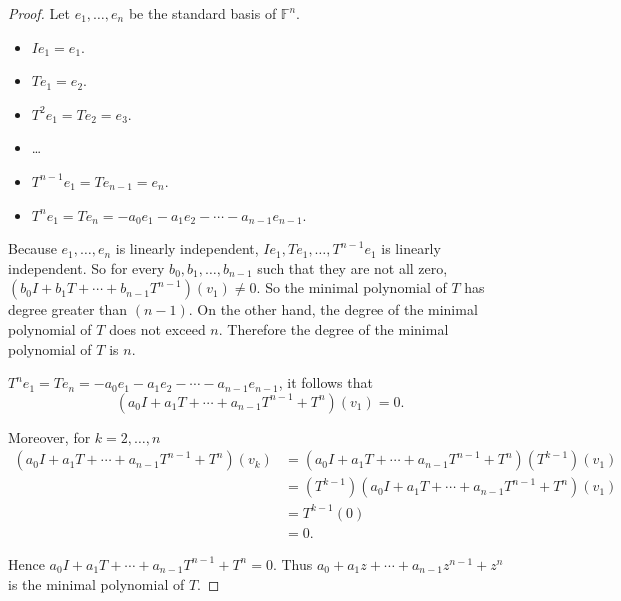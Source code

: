 \begin{proof}
    Let $e_{1}, \ldots, e_{n}$ be the standard basis of $\mathbb{F}^{n}$.
    \begin{itemize}
        \item $Ie_{1} = e_{1}$.
        \item $Te_{1} = e_{2}$.
        \item $T^{2}e_{1} = Te_{2} = e_{3}$.
        \item \ldots
        \item $T^{n-1}e_{1} = Te_{n-1} = e_{n}$.
        \item $T^{n}e_{1} = Te_{n} = -a_{0}e_{1} - a_{1}e_{2} - \cdots - a_{n-1}e_{n-1}$.
    \end{itemize}

    Because $e_{1}, \ldots, e_{n}$ is linearly independent, $Ie_{1}, Te_{1}, \ldots, T^{n-1}e_{1}$ is linearly independent. So for every $b_{0}, b_{1}, \ldots, b_{n-1}$ such that they are not all zero, $(b_{0}I + b_{1}T + \cdots + b_{n-1}T^{n-1})(v_{1})\ne 0$. So the minimal polynomial of $T$ has degree greater than $(n - 1)$. On the other hand, the degree of the minimal polynomial of $T$ does not exceed $n$. Therefore the degree of the minimal polynomial of $T$ is $n$.

    $T^{n}e_{1} = Te_{n} = -a_{0}e_{1} - a_{1}e_{2} - \cdots - a_{n-1}e_{n-1}$, it follows that
    \[
        (a_{0}I + a_{1}T + \cdots + a_{n-1}T^{n-1} + T^{n})(v_{1}) = 0.
    \]

    Moreover, for $k = 2, \ldots, n$
    \begin{align*}
        (a_{0}I + a_{1}T + \cdots + a_{n-1}T^{n-1} + T^{n})(v_{k}) & = (a_{0}I + a_{1}T + \cdots + a_{n-1}T^{n-1} + T^{n})(T^{k-1})(v_{1}) \\
                                                                   & = (T^{k-1})(a_{0}I + a_{1}T + \cdots + a_{n-1}T^{n-1} + T^{n})(v_{1}) \\
                                                                   & = T^{k-1}(0)                                                          \\
                                                                   & = 0.
    \end{align*}

    Hence $a_{0}I + a_{1}T + \cdots + a_{n-1}T^{n-1} + T^{n} = 0$. Thus $a_{0} + a_{1}z + \cdots + a_{n-1}z^{n-1} + z^{n}$ is the minimal polynomial of $T$.
\end{proof}
\newpage

